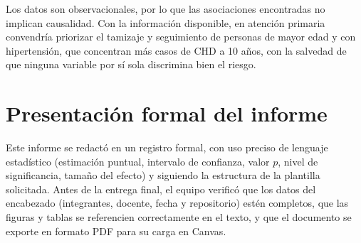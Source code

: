 \documentclass[11pt,a4paper]{article}
\begin{document}
Los datos son observacionales, por lo que las asociaciones encontradas no implican causalidad. Con la información disponible, en atención primaria convendría priorizar el tamizaje y seguimiento de personas de mayor edad y con hipertensión, que concentran más casos de CHD a 10 años, con la salvedad de que ninguna variable por sí sola discrimina bien el riesgo.

\section{Presentación formal del informe}

Este informe se redactó en un registro formal, con uso preciso de lenguaje estadístico
(estimación puntual, intervalo de confianza, valor $p$, nivel de significancia, tamaño del
efecto) y siguiendo la estructura de la plantilla solicitada. Antes de la entrega final, el
equipo verificó que los datos del encabezado (integrantes, docente, fecha y repositorio) estén
completos, que las figuras y tablas se referencien correctamente en el texto, y que el documento
se exporte en formato PDF para su carga en Canvas.
\end{document}
